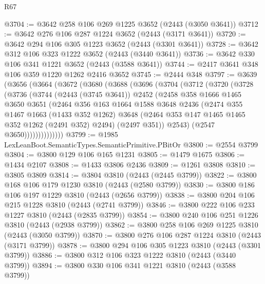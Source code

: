 \begin{lexlean}{R67}
\begin{coremodule}
@3704 := @3642 @258 @106 @269 @1225 @3652 (@2443 (@3050 @3641))
@3712 := @3642 @276 @106 @287 @1224 @3652 (@2443 (@3171 @3641))
@3720 := @3642 @294 @106 @305 @1223 @3652 (@2443 (@3301 @3641))
@3728 := @3642 @312 @106 @323 @1222 @3652 (@2443 (@3440 @3641))
@3736 := @3642 @330 @106 @341 @1221 @3652 (@2443 (@3588 @3641))
@3744 := @2417 @3641 @348 @106 @359 @1220 @1262 @2416 @3652
@3745 := @2444 @348
@3797 := @3639
    (@3656
      (@3664
        (@3672
          (@3680
            (@3688
              (@3696
                (@3704
                  (@3712
                    (@3720
                      (@3728
                        (@3736
                          (@3744
                            (@2443 (@3745 @3641))
                            @2452
                            (@2458
                              @358
                              @1666
                              @1465
                              @3650
                              @3651
                              (@2464
                                @356
                                @163
                                @1664
                                @1588
                                @3648
                                @2436
                                (@2474
                                  @355
                                  @1467
                                  @1663
                                  (@1433 @352 @1262)
                                  @3648
                                  (@2464 @353 @147 @1465 @1465 @352 @1262 (@2491 @352) @2494)
                                  (@2497 @351))
                                @2543)
                              (@2547 @3650))))))))))))))
@3799 := @1985 LexLeanBoot.SemanticTypes.SemanticPrimitive.PBitOr
@3800 := @2554 @3799
@3804 := @3800 @129 @106 @165 @1231
@3805 := @1479 @1675
@3806 := @1434 @2107
@3808 := @1433 @3806 @2436
@3809 := @1261 @3808
@3810 := @3805 @3809
@3814 := @3804 @3810 (@2443 (@2445 @3799))
@3822 := @3800 @168 @106 @179 @1230 @3810 (@2443 (@2580 @3799))
@3830 := @3800 @186 @106 @197 @1229 @3810 (@2443 (@2656 @3799))
@3838 := @3800 @204 @106 @215 @1228 @3810 (@2443 (@2741 @3799))
@3846 := @3800 @222 @106 @233 @1227 @3810 (@2443 (@2835 @3799))
@3854 := @3800 @240 @106 @251 @1226 @3810 (@2443 (@2938 @3799))
@3862 := @3800 @258 @106 @269 @1225 @3810 (@2443 (@3050 @3799))
@3870 := @3800 @276 @106 @287 @1224 @3810 (@2443 (@3171 @3799))
@3878 := @3800 @294 @106 @305 @1223 @3810 (@2443 (@3301 @3799))
@3886 := @3800 @312 @106 @323 @1222 @3810 (@2443 (@3440 @3799))
@3894 := @3800 @330 @106 @341 @1221 @3810 (@2443 (@3588 @3799))

\end{coremodule}
\end{lexlean}
